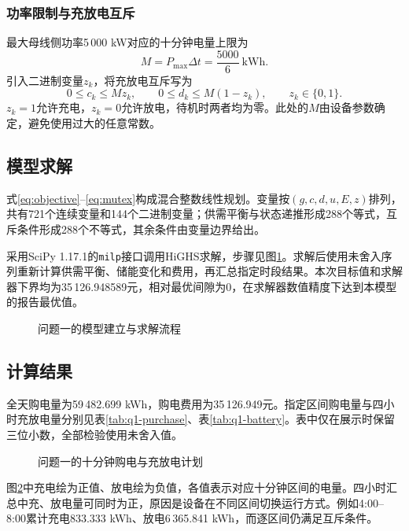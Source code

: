 \subsubsection{功率限制与充放电互斥}
最大母线侧功率5\,000 kW对应的十分钟电量上限为
\begin{equation}
  M=P_{\max}\Delta t=\frac{5000}{6}\ \mathrm{kWh}.
  \label{eq:M}
\end{equation}
引入二进制变量$z_k$，将充放电互斥写为
\begin{equation}
  0\le c_k\le Mz_k,\qquad
  0\le d_k\le M(1-z_k),\qquad z_k\in\{0,1\}.
  \label{eq:mutex}
\end{equation}
$z_k=1$允许充电，$z_k=0$允许放电，待机时两者均为零。此处的$M$由设备参数确定，避免使用过大的任意常数。

\subsection{模型求解}
式\eqref{eq:objective}--\eqref{eq:mutex}构成混合整数线性规划。变量按$(g,c,d,u,E,z)$排列，共有721个连续变量和144个二进制变量；供需平衡与状态递推形成288个等式，互斥条件形成288个不等式，其余条件由变量边界给出。

采用SciPy 1.17.1的\texttt{milp}接口调用HiGHS求解\cite{scipyMilp,highs}，步骤见图\ref{fig:workflow}。求解后使用未舍入序列重新计算供需平衡、储能变化和费用，再汇总指定时段结果。本次目标值和求解器下界均为35\,126.948589元，相对最优间隙为0，在求解器数值精度下达到本模型的报告最优值。
\begin{figure}[H]
  \centering
  \caption{问题一的模型建立与求解流程}
  \label{fig:workflow}
\end{figure}

\subsection{计算结果}
全天购电量为59\,482.699 kWh，购电费用为35\,126.949元。指定区间购电量与四小时充放电量分别见表\ref{tab:q1-purchase}、表\ref{tab:q1-battery}。表中仅在展示时保留三位小数，全部检验使用未舍入值。


\begin{figure}[H]
  \centering
  \caption{问题一的十分钟购电与充放电计划}
  \label{fig:dispatch}
\end{figure}
图\ref{fig:dispatch}中充电绘为正值、放电绘为负值，各值表示对应十分钟区间的电量。四小时汇总中充、放电量可同时为正，原因是设备在不同区间切换运行方式。例如4:00--8:00累计充电833.333 kWh、放电6\,365.841 kWh，而逐区间仍满足互斥条件。

